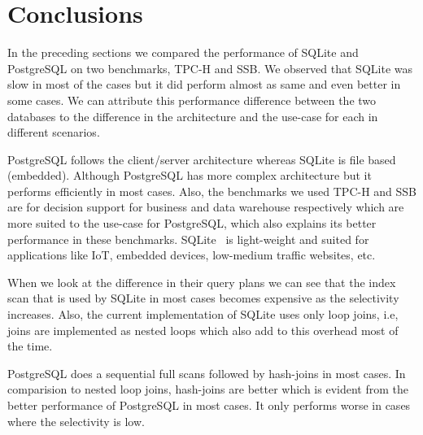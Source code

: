 \section{Conclusions}
\label{sec:conclusion}
In the preceding sections we compared the performance of SQLite and PostgreSQL on two benchmarks, TPC-H and SSB. We observed that SQLite was slow in most of the cases but it did perform almost as same and even better in some cases. We can attribute this performance difference between the two databases to the difference in the architecture and the use-case for each in different scenarios.

PostgreSQL follows the client/server architecture whereas SQLite is file based (embedded). Although PostgreSQL has more complex architecture but it performs efficiently in most cases. Also, the benchmarks we used TPC-H and SSB are for decision support for business and data warehouse respectively which are more suited to the use-case for PostgreSQL, which also explains its better performance in these benchmarks. SQLite~\cite{ref:compare} is light-weight and suited for applications like IoT, embedded devices, low-medium traffic websites, etc. 

When we look at the difference in their query plans we can see that the index scan that is used by SQLite in most cases becomes expensive as the selectivity increases. Also, the current implementation of SQLite uses only loop joins, i.e, joins are implemented as nested loops which also add to this overhead most of the time.

PostgreSQL does a sequential full scans followed by hash-joins in most cases. In comparision to nested loop joins, hash-joins are better which is evident from the better performance of PostgreSQL in most cases. It only performs worse in cases where the selectivity is low.
 
